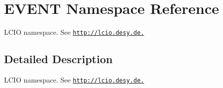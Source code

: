 \hypertarget{namespace_e_v_e_n_t}{
\section{EVENT Namespace Reference}
\label{namespace_e_v_e_n_t}
}


LCIO namespace. See \href{http://lcio.desy.de.}{\tt http://lcio.desy.de.}  


\subsection{Detailed Description}
LCIO namespace. See \href{http://lcio.desy.de.}{\tt http://lcio.desy.de.} 